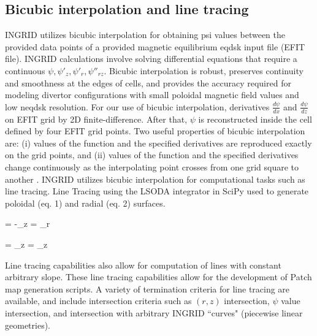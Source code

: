 \subsection{\label{sec:level2}Bicubic interpolation and line tracing}
INGRID utilizes bicubic interpolation for obtaining psi values between the provided data points of a provided magnetic equilibrium eqdsk input file (EFIT file). INGRID calculations involve solving differential equations that require a continuous $\psi, \psi'_{z}, \psi'_{r}, \psi''_{rz}$. Bicubic interpolation is robust, preserves continuity and smoothness at the edges of cells, and provides the accuracy required for modeling divertor configurations with small poloidal magnetic field values and low neqdsk resolution. For our use of bicubic interpolation, derivatives $\frac{d \psi}{dx}$ and $\frac{d\psi}{dz}$ on EFIT grid by 2D finite-difference. After that, $\psi$ is reconstructed inside the cell defined by four EFIT grid points. Two useful properties of bicubic interpolation are: (i) values of the function and the specified derivatives are reproduced exactly on the grid points, and (ii) values of the function and the specified derivatives change continuously as the interpolating point crosses from one grid square to another \cite{Press_1992}. INGRID utilizes bicubic interpolation for computational tasks such as line tracing. Line Tracing using the LSODA integrator in SciPy used to generate poloidal (eq. 1) and radial (eq. 2) surfaces.

\beq
%
 = -\psi_{z} \quad {} = \psi_{r}
%
\eeq

\beq
%
 = \psi_{z} \quad {} = \psi_{z}
%
\eeq

\noindent
Line tracing capabilities also allow for computation of lines with constant arbitrary slope. These line tracing capabilities allow for the development of Patch map generation scripts. A variety of termination criteria for line tracing are available, and include intersection criteria such as $(r,z)$ intersection, $\psi$ value intersection, and intersection with arbitrary INGRID ``curves" (piecewise linear geometries).